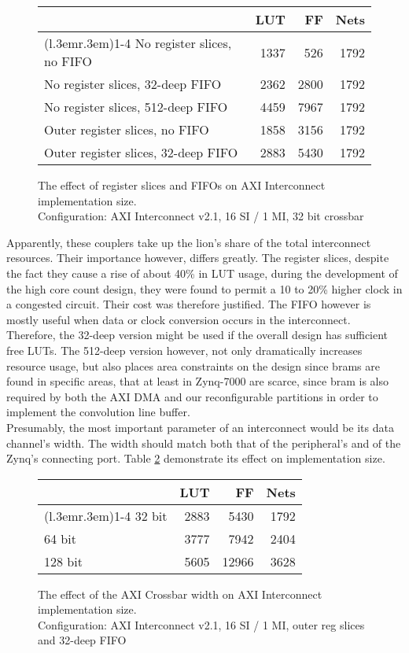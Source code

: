 \begin{figure}[ht!]
\centering
\begin{tabular}{lrrr}
\toprule
	& LUT	& FF	& Nets \\
\cmidrule(l{.3em}r{.3em}){1-4}
No register slices, no FIFO		& 1337 & 526 & 1792 \\
No register slices, 32-deep FIFO	& 2362 & 2800 & 1792 \\
No register slices, 512-deep FIFO	& 4459 & 7967 & 1792 \\
Outer register slices, no FIFO		& 1858 & 3156 & 1792 \\
Outer register slices, 32-deep FIFO	& 2883 & 5430 & 1792 \\
\bottomrule
\end{tabular}
\caption{The effect of register slices and FIFOs on AXI Interconnect implementation size.\\
	Configuration: AXI Interconnect v2.1, 16 SI / 1 MI, 32 bit crossbar}
\label{tab:int-reg}
\end{figure}

Apparently, these couplers take up the lion's share of the total interconnect resources.
Their importance however, differs greatly.
The register slices, despite the fact they cause a rise of about 40\% in LUT usage,
during the development of the high core count design,
they were found to permit a 10 to 20\% higher clock in a congested circuit.
Their cost was therefore justified.
The FIFO however is mostly useful when data or clock conversion occurs in the
interconnect. Therefore, the 32-deep version might be used if the overall design
has sufficient free LUTs. The 512-deep version however,
not only dramatically increases resource usage, but also places area constraints on
the design since \glspl{bram} are found in specific areas, that at least in Zynq-7000
are scarce, since \gls{bram} is also required by both the AXI DMA and our reconfigurable
partitions in order to implement the convolution line buffer.
\\

Presumably, the most important parameter of an interconnect would be its data channel's width.
The width should match both that of the peripheral's and of the Zynq's connecting port.
Table \ref{tab:int-width} demonstrate its effect on implementation size.

\begin{figure}[ht!]
\centering
\begin{tabular}{lrrr}
\toprule
	& LUT	& FF	& Nets \\
\cmidrule(l{.3em}r{.3em}){1-4}
32 bit	& 2883	& 5430	& 1792 \\
64 bit	& 3777	& 7942	& 2404 \\
128 bit	& 5605	& 12966	& 3628 \\
\bottomrule
\end{tabular}
\caption{The effect of the AXI Crossbar width on AXI Interconnect implementation size.\\
	Configuration: AXI Interconnect v2.1, 16 SI / 1 MI, outer reg slices and 32-deep FIFO}
\label{tab:int-width}
\end{figure}


